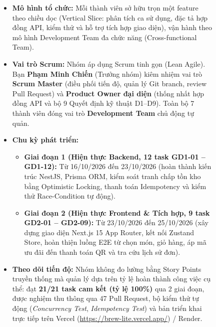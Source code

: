 \documentclass[12pt,a4paper,oneside]{report}
\begin{document}
\begin{figure}[H]
\centering
\begin{tcolorbox}[colback=gray!5,colframe=gray!50,title=Ghi nhận tiến độ và số liệu thực tế của Nhóm]
\begin{itemize}[leftmargin=1.5cm]
  \item \textbf{Mô hình tổ chức:} Mỗi thành viên sở hữu trọn một feature theo chiều dọc (Vertical Slice: phân tích ca sử dụng, đặc tả hợp đồng API, kiểm thử và hỗ trợ tích hợp giao diện), vận hành theo mô hình Development Team đa chức năng (Cross-functional Team).
  
  \item \textbf{Vai trò Scrum:} Nhóm áp dụng Scrum tinh gọn (Lean Agile). Bạn \textbf{Phạm Minh Chiến} (Trưởng nhóm) kiêm nhiệm vai trò \textbf{Scrum Master} (điều phối tiến độ, quản lý Git branch, review Pull Request) và \textbf{Product Owner đại diện} (thống nhất hợp đồng API và bộ 9 Quyết định kỹ thuật D1--D9). Toàn bộ 7 thành viên đóng vai trò \textbf{Development Team} chủ động tự quản.
  
  \item \textbf{Chu kỳ phát triển:}
  \begin{itemize}
    \item \textbf{Giai đoạn 1 (Hiện thực Backend, 12 task GD1-01 -- GD1-12):} Từ 16/10/2026 đến 23/10/2026 (hoàn thành kiến trúc NestJS, Prisma ORM, kiểm soát tranh chấp tồn kho bằng Optimistic Locking, thanh toán Idempotency và kiểm thử Race-Condition tự động).
    \item \textbf{Giai đoạn 2 (Hiện thực Frontend \& Tích hợp, 9 task GD2-01 -- GD2-09):} Từ 23/10/2026 đến 25/10/2026 (xây dựng giao diện Next.js 15 App Router, kết nối Zustand Store, hoàn thiện luồng E2E từ chọn món, giỏ hàng, áp mã ưu đãi đến thanh toán QR và tra cứu lịch sử đơn).
  \end{itemize}
  
  \item \textbf{Theo dõi tiến độ:} Nhóm không đo lường bằng Story Points truyền thống mà quản lý dựa trên tỷ lệ hoàn thành công việc cụ thể: đạt \textbf{21/21 task cam kết (tỷ lệ 100\%)} qua 2 giai đoạn, được nghiệm thu thông qua 47 Pull Request, bộ kiểm thử tự động (\textit{Concurrency Test}, \textit{Idempotency Test}) và bản triển khai trực tiếp trên Vercel (\url{https://brew-lite.vercel.app/}) / Render.
  

\end{itemize}
\end{tcolorbox}
\end{figure}
\end{document}
